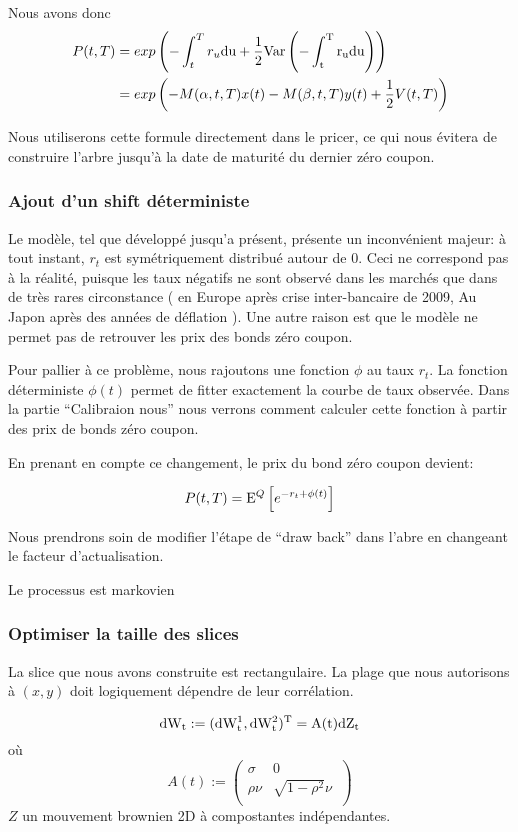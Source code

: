 Nous avons donc
\begin{align}
  P(t, T) &= exp  \left(  -\int_t^T r_u \rm{d}u + \frac{1}{2} Var \left( {-\int_t^T r_u \rm{d}u} \right)  \right) \\
          &= exp  \left( - M(\alpha, t, T) x(t) - M(\beta, t, T) y(t) + \frac{1}{2} V(t, T) \right)
  \end{align}

Nous utiliserons cette formule directement dans le pricer, ce qui nous évitera de construire l'arbre jusqu'à la date de maturité du dernier zéro coupon.

\subsubsection{Ajout d'un shift déterministe}
Le modèle, tel que développé jusqu'a présent, présente un inconvénient majeur: à tout instant, $r_t$ est symétriquement distribué autour de $0$. Ceci ne correspond pas à la réalité, puisque les taux négatifs ne sont observé dans les marchés que dans de très rares circonstance ( en Europe après crise inter-bancaire de 2009, Au Japon après des années de déflation ). Une autre raison est que le modèle ne permet pas de retrouver les prix des bonds zéro coupon.

Pour pallier à ce problème, nous rajoutons une fonction $\phi$ au taux $r_t$. La fonction déterministe $\phi(t)$ permet de fitter exactement la courbe de taux observée. Dans la partie ``Calibraion nous'' nous verrons comment calculer cette fonction à partir des prix de bonds zéro coupon.

En prenant en compte ce changement, le prix du bond zéro coupon devient:

$$P(t, T) = \mathrm{E}^Q \left[  e^{-r_t + \phi(t)} \right]$$

Nous prendrons soin de modifier l'étape de ``draw back'' dans l'abre en changeant le facteur d'actualisation.

Le processus est markovien

\subsubsection{Optimiser la taille des slices }

La slice que nous avons construite est rectangulaire.
La plage que nous autorisons à $(x, y)$ doit logiquement dépendre de leur corrélation.

$$ \rm{d} W_t := (\rm{d} W^1_t, \rm{d} W^2_t)^T = A(t)  \rm{d}Z_t$$
où
$$
A(t) := 
\left(
  \begin{array}{cc}
            \sigma & 0  \\
            \rho \nu & \sqrt{1-\rho^2} \nu \  \\
  \end{array}
\right)
$$
$Z$ un mouvement brownien 2D à compostantes indépendantes.

